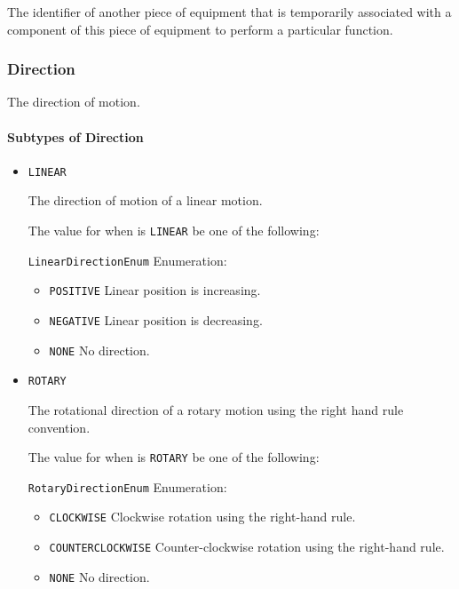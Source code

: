 The identifier of another piece of equipment that is temporarily associated with a component of this piece of equipment to perform a particular function.




\subsubsection{Direction}




The direction of motion.


\paragraph{Subtypes of Direction}\mbox{}
\label{sec:Subtypes of Direction}

\begin{itemize}

\item \texttt{LINEAR}


The direction of motion of a linear motion.


The value for  when  is \texttt{LINEAR} \MUST be one of the following: 


\texttt{LinearDirectionEnum} Enumeration:

\begin{itemize}
\item \texttt{POSITIVE} \newline Linear position is increasing. 
\item \texttt{NEGATIVE} \newline Linear position is decreasing. 
\item \texttt{NONE} \newline No direction. 
\end{itemize}

\item \texttt{ROTARY}


The rotational direction of a rotary motion using the right hand rule convention.


The value for  when  is \texttt{ROTARY} \MUST be one of the following: 


\texttt{RotaryDirectionEnum} Enumeration:

\begin{itemize}
\item \texttt{CLOCKWISE} \newline Clockwise rotation using the right-hand rule. 
\item \texttt{COUNTER\textunderscore CLOCKWISE} \newline Counter-clockwise rotation using the right-hand rule. 
\item \texttt{NONE} \newline No direction. 
\end{itemize}


\end{itemize}





